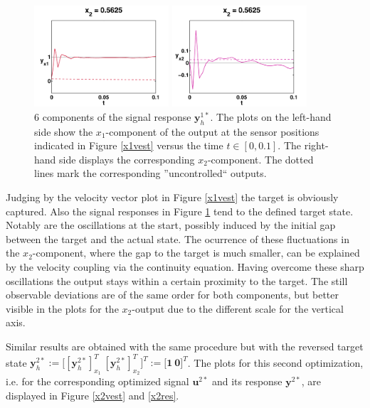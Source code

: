 \documentclass[a4paper,10pt,BCOR=15mm]{scrbook}
\begin{document}
\begin{figure}
\begin{minipage}[b]{5cm}
    \includegraphics[width=5cm]{pics/fullOpti/new/x1_sigx2_3.pdf}  
  \end{minipage}
 \begin{minipage}[b]{5cm}
    \includegraphics[width=5cm]{pics/fullOpti/new/x1_sigx22_3.pdf}  
  \end{minipage}
   \caption{6 components of the signal response $\mathbf y_h^{1*}$. The plots on the left-hand side show the $x_1$-component of the output at the sensor positions indicated in Figure \ref{x1vest} versus the time $t\in [0,0.1]$. The right-hand side displays the corresponding $x_2$-component. The dotted lines mark the corresponding ''uncontrolled`` outputs.} 
\label{x1res}
\end{figure}

Judging by the velocity vector plot in Figure \ref{x1vest} the target is obviously captured. Also the signal responses in Figure \ref{x1res} tend to the defined target state. Notably are the oscillations at the start, possibly induced by the initial gap between the target and the actual state. The ocurrence of these fluctuations in the $x_2$-component, where the gap to the target is much smaller, can be explained by the velocity coupling via the continuity equation. Having overcome these sharp oscillations the output stays within a certain proximity to the target. The still observable deviations are of the same order for both components, but better visible in the plots for the $x_2$-output due to the different scale for the vertical axis. 

Similar results are obtained with the same procedure but with the reversed target state $\mathbf y_h^{2*} := \bigl [[\mathbf y_h^{2*}]_{x_1}^T~[\mathbf y_h^{2*}]_{x_2}^T \bigr ]^T := \bigl [ \mathbf 1~ \mathbf 0 \bigr ]^T$. The plots for this second optimization, i.e. for the corresponding optimized signal $\mathbf u^{2*}$ and its response $\mathbf y^{2*}$, are displayed in Figure \ref{x2vest} and \ref{x2res}.
\end{document}
